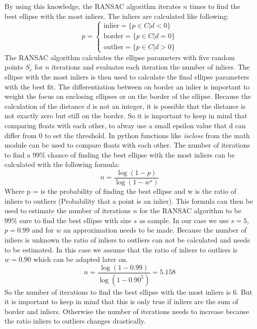 By using this knowledge, the RANSAC algorithm iterates $n$ times to find the best ellipse with the most inliers. The inliers are calculated like following: 
\begin{equation}
    p =\begin{cases}
    \text{inlier} = \{p \in C | d < 0\}\\
    \text{border} = \{p \in C | d = 0\}\\
    \text{outlier} = \{p \in C | d > 0\}
    \end{cases}
    \label{inliers}
\end{equation}
The RANSAC algorithm calculates the ellipse parameters with five random points $S_c$ for $n$ iterations and evaluates each iteration the number of inliers. The ellipse with the most inliers is then used to calculate the final ellipse parameters with the best fit. 
The differentiation between on border an inlier is important to weight the focus on enclosing ellipses or on the border of the ellipse. Because the calculation of the distance $d$ is not an integer, it is possible that the distance is not exactly zero but still on the border. So it is important to keep in mind that comparing floats with each other, to alway use a small epsilon value that d can differ from 0 to set the threshold. 
In python functions like \textit{isclose} from the math module can be used to compare floats with each other. The number of iterations to find a 99\% chance of finding the best ellipse with the most inliers can be calculated with the following formula: 
\begin{equation}
    n = \frac{\log(1-p)}{\log(1-w^s)}
    \label{iterations}
\end{equation}
Where p = is the probability of finding the best ellipse and w is the ratio of inliers to outliers (Probability that a point is an inlier). This formula can then be used to estimate the number of iterations $n$ for the RANSAC algorithm to be 99\% sure to find the best ellipse with size $s$ as sample. In our case we use $s=5$, $p=0.99$ and for $w$ an approximation needs to be made. Because the number of inliers is unknown the ratio of inliers to outliers can not be calculated and needs to be estimated. In this case we assume that the ratio of inliers to outliers is $w=0.90$ which can be adapted later on. 
\begin{equation}
    n = \frac{\log(1-0.99)}{\log(1-0.90^5)} =  5.158
\end{equation}
So the number of iterations to find the best ellipse with the most inliers is 6. But it is important to keep in mind that this is only true if inliers are the sum of border and inliers. Otherwise the number of iterations needs to increase because the ratio inliers to outliers changes drastically. 


